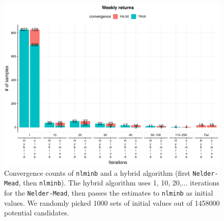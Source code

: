 \documentclass[]{interact}\usepackage[]{graphicx}\usepackage[dvipsnames]{xcolor}
\makeatletter
\def\maxwidth{ %
  \ifdim\Gin@nat@width>\linewidth
    \linewidth
  \else
    \Gin@nat@width
  \fi
}
\newenvironment{knitrout}{}{} %
\theoremstyle{plain}%
\theoremstyle{definition}
\theoremstyle{remark}
\makeatother
\begin{document}
\begin{knitrout}
\color{fgcolor}\begin{figure}[htb]

{\centering \includegraphics[width=\maxwidth]{figure/Nelder-Mead-convergence-per-iteration-1} 

}

\caption{Convergence counts of \texttt{nlminb} and a hybrid algorithm (first \texttt{Nelder-Mead}, then \texttt{nlminb}). The hybrid algorithm uses 1, 10, 20,$\ldots$ iterations for the \texttt{Nelder-Mead}, then passes the estimates to \texttt{nlminb} as initial values. We randomly picked 1000 sets of initial values out of 1458000 potential candidates.}\label{fig:Nelder-Mead-convergence-per-iteration}
\end{figure}

\end{knitrout}
\end{document}
